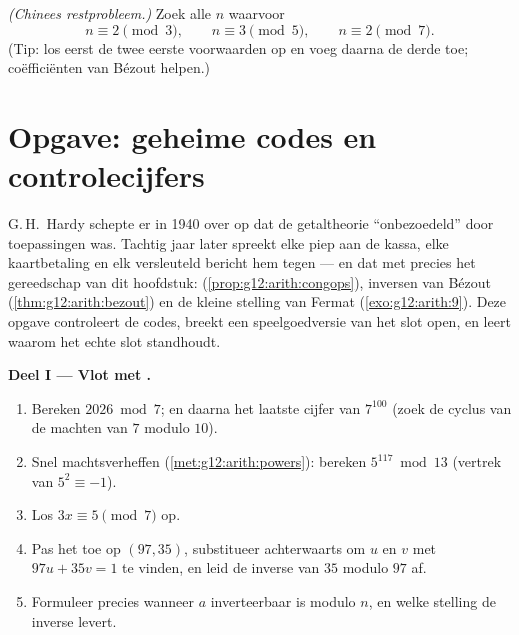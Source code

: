 \begin{exercise}[$\star\star\star$]\label{exo:g12:arith:10}
\emph{(Chinees restprobleem.)} Zoek alle  $n$ waarvoor
\[
n \equiv 2 \pmod 3, \qquad n \equiv 3 \pmod 5, \qquad n \equiv 2 \pmod 7 .
\]
(Tip: los eerst de twee eerste voorwaarden op en voeg daarna de derde toe;
coëfficiënten van Bézout helpen.)
\end{exercise}

\section{Opgave: geheime codes en controlecijfers}

\begin{problem}
\label{pb:g12:arith:1}
G.\,H.~Hardy schepte er in 1940 over op dat de getaltheorie ``onbezoedeld''
door toepassingen was. Tachtig jaar later spreekt elke piep aan de kassa, elke
kaartbetaling en elk versleuteld bericht hem tegen --- en dat met precies het
gereedschap van dit hoofdstuk: 
(\cref{prop:g12:arith:congops}), inversen van Bézout
(\cref{thm:g12:arith:bezout}) en de kleine stelling van Fermat
(\cref{exo:g12:arith:9}). Deze opgave controleert de codes, breekt een
speelgoedversie van het slot open, en leert waarom het echte slot standhoudt.

\medskip
\noindent\textbf{Deel I --- Vlot met .}
\begin{enumerate}
  \item Bereken $2026 \bmod 7$; en daarna het laatste cijfer van $7^{100}$
        (zoek de cyclus van de machten van $7$ modulo $10$).
  \item Snel machtsverheffen (\cref{met:g12:arith:powers}): bereken
        $5^{117} \bmod 13$ (vertrek van $5^2 \equiv -1$).
  \item Los $3x \equiv 5 \pmod 7$ op.
  \item Pas het  toe op $(97, 35)$, substitueer
        achterwaarts om  $u$ en $v$ met $97u + 35v = 1$ te
        vinden, en leid de inverse van $35$ modulo $97$ af.
  \item Formuleer precies wanneer $a$ inverteerbaar is modulo $n$, en welke
        stelling de inverse levert.
\end{enumerate}


\end{problem}
